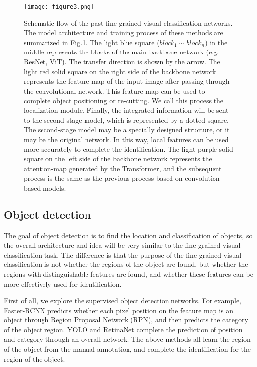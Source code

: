 \documentclass[conference]{IEEEtran}
\begin{document}
\begin{figure}
\centerline{\texttt{[image: figure3.png]}}
\caption{Schematic flow of the past fine-grained visual classification networks. The model architecture and training process of these methods are summarized in Fig.\ref{fig3}. The light blue square ($ block_{1}\sim block_{n}$) in the middle represents the blocks of the main backbone network (e.g. ResNet\cite{ResNet}, ViT\cite{ViT}). The transfer direction is shown by the arrow. The light red solid square on the right side of the backbone network represents the feature map of the input image after passing through the convolutional network. This feature map can be used to complete object positioning or re-cutting. We call this process the localization module. Finally, the integrated information will be sent to the second-stage model, which is represented by a dotted square. The second-stage model may be a specially designed structure, or it may be the original network. In this way, local features can be used more accurately to complete the identification. The light purple solid square on the left side of the backbone network represents the attention-map generated by the Transformer, and the subsequent process is the same as the previous process based on convolution-based models.}
\label{fig3}
\end{figure}

\subsection{Object detection}
The goal of object detection is to find the location and classification of objects, so the overall architecture and idea will be very similar to the fine-grained visual classification task. The difference is that the purpose of the fine-grained visual classification is not whether the regions of the object are found, but whether the regions with distinguishable features are found, and whether these features can be more effectively used for identification.

First of all, we explore the supervised object detection networks. For example, Faster-RCNN\cite{Faster_RCNN} predicts whether each pixel position on the feature map is an object through Region Proposal Network (RPN), and then predicts the category of the object region. YOLO\cite{YOLO}\cite{YOLO_v4} and RetinaNet\cite{RetinaNet} complete the prediction of position and category through an overall network. The above methods all learn the region of the object from the manual annotation, and complete the identification for the region of the object.
\end{document}
